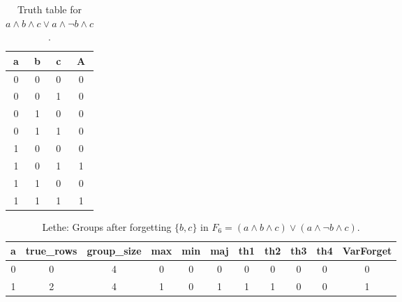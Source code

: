\begin{table}[!tb]
    \centering
    \begin{tabular}{|c|c|c|c|}
        \hline
        \textbf{a} & \textbf{b} & \textbf{c} & \textbf{A} \\ \hline
        0 & 0 & 0 & 0 \\ \hline
        0 & 0 & 1 & 0 \\ \hline
        0 & 1 & 0 & 0 \\ \hline
        0 & 1 & 1 & 0 \\ \hline
        1 & 0 & 0 & 0 \\ \hline
        1 & 0 & 1 & 1 \\ \hline
        1 & 1 & 0 & 0 \\ \hline
        1 & 1 & 1 & 1 \\ \hline
    \end{tabular}
    \caption{Truth table for $a \land b \land c \lor a \land \lnot b \land c$.}
    \label{tab:truthtab}
\end{table}

\begin{table}[!tb]
    \centering
    \begin{tabular}{|c|c|c|c|c|c|c|c|c|c|c|}
        \hline
        \textbf{a} & \textbf{true\_rows} & \textbf{group\_size} & \textbf{max} & \textbf{min} & \textbf{maj} & \textbf{th1} & \textbf{th2} & \textbf{th3} & \textbf{th4} & \textbf{VarForget} \\ \hline
        \rowcolor{gray!40} 0 & 0 & 4 & 0 & 0 & 0 & 0 & 0 & 0 & 0 & 0 \\ \hline
        \rowcolor{blue!40} 1 & 2 & 4 & 1 & 0 & 1 & 1 & 1 & 0 & 0 & 1 \\ \hline
    \end{tabular}
    \caption{Lethe: Groups after forgetting $\{b, c\}$ in $F_{6} = (a \land b \land c) \lor (a \land \lnot b \land c)$.}
    \label{tab:lethe-F6-bc-groups}
\end{table}
